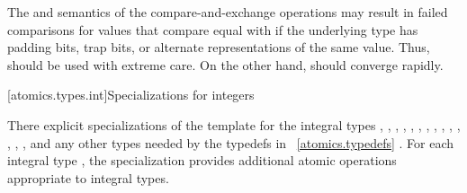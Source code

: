 \begin{itemdescr}
\pnum
\begin{note} The  and  semantics of the compare-and-exchange
operations may result in failed comparisons for values that compare equal with
 if the underlying type has padding bits, trap bits, or alternate
representations of the same value. Thus,  should be used
with extreme care. On the other hand,  should converge
rapidly. \end{note}
\end{itemdescr}

[atomics.types.int]{Specializations for integers}

%
\pnum
There   explicit specializations of the 
template for the integral types
,
,
,
,
,
,
,
,
,
,
,
,
,
,
and any other types needed by the typedefs in ~\ref{atomics.typedefs} .
For each  integral type , the specialization
 provides additional atomic operations appropriate to integral types.

